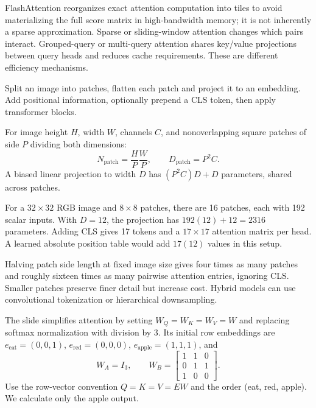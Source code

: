 \documentclass[11pt]{article}
\begin{document}
FlashAttention reorganizes exact attention computation into tiles to avoid materializing the full score matrix in high-bandwidth memory; it is not inherently a sparse approximation. Sparse or sliding-window attention changes which pairs interact. Grouped-query or multi-query attention shares key/value projections between query heads and reduces cache requirements. These are different efficiency mechanisms.

Split an image into patches, flatten each patch and project it to an embedding. Add positional information, optionally prepend a CLS token, then apply transformer blocks.

For image height $H$, width $W$, channels $C$, and nonoverlapping square patches of side $P$ dividing both dimensions:
\[
N_{\mathrm{patch}}=\frac{H}{P}\frac{W}{P},\qquad
D_{\mathrm{patch}}=P^2C.
\]
A biased linear projection to width $D$ has $(P^2C)D+D$ parameters, shared across patches.

For a $32\times32$ RGB image and $8\times8$ patches, there are 16 patches, each with 192 scalar inputs. With $D=12$, the projection has $192(12)+12=2316$ parameters. Adding CLS gives 17 tokens and a $17\times17$ attention matrix per head. A learned absolute position table would add $17(12)$ values in this setup.

Halving patch side length at fixed image size gives four times as many patches and roughly sixteen times as many pairwise attention entries, ignoring CLS. Smaller patches preserve finer detail but increase cost. Hybrid models can use convolutional tokenization or hierarchical downsampling.

The slide simplifies attention by setting $W_Q=W_K=W_V=W$ and replacing softmax normalization with division by 3. Its initial row embeddings are
$e_{\mathrm{eat}}=(0,0,1)$, $e_{\mathrm{red}}=(0,0,0)$,
$e_{\mathrm{apple}}=(1,1,1)$, and
\[
W_A=I_3,\qquad
W_B=\begin{bmatrix}1&1&0\\0&1&1\\1&0&0\end{bmatrix}.
\]
Use the row-vector convention $Q=K=V=EW$ and the order (eat, red, apple). We calculate only the apple output.
\end{document}
